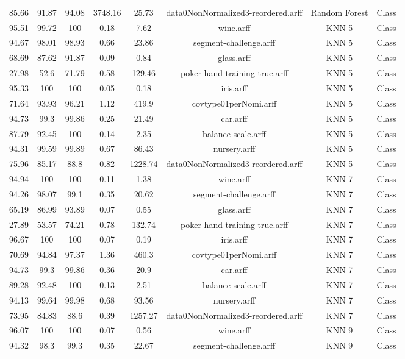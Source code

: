 \begin{longtable}{@{\extracolsep{}}cccccccc}
85.66	&	91.87	&	94.08	&	3748.16	&	25.73	&	 data0NonNormalized3-reordered.arff	&	 Random Forest	&	Class	\\
95.51	&	99.72	&	100	&	0.18	&	7.62	&	 wine.arff	&	 KNN 5	&	Class	\\
94.67	&	98.01	&	98.93	&	0.66	&	23.86	&	 segment-challenge.arff	&	 KNN 5	&	Class	\\
68.69	&	87.62	&	91.87	&	0.09	&	0.84	&	 glass.arff	&	 KNN 5	&	Class	\\
27.98	&	52.6	&	71.79	&	0.58	&	129.46	&	 poker-hand-training-true.arff	&	 KNN 5	&	Class	\\
95.33	&	100	&	100	&	0.05	&	0.18	&	 iris.arff	&	 KNN 5	&	Class	\\
71.64	&	93.93	&	96.21	&	1.12	&	419.9	&	 covtype01perNomi.arff	&	 KNN 5	&	Class	\\
94.73	&	99.3	&	99.86	&	0.25	&	21.49	&	 car.arff	&	 KNN 5	&	Class	\\
87.79	&	92.45	&	100	&	0.14	&	2.35	&	 balance-scale.arff	&	 KNN 5	&	Class	\\
94.31	&	99.59	&	99.89	&	0.67	&	86.43	&	 nursery.arff	&	 KNN 5	&	Class	\\
75.96	&	85.17	&	88.8	&	0.82	&	1228.74	&	 data0NonNormalized3-reordered.arff	&	 KNN 5	&	Class	\\
94.94	&	100	&	100	&	0.11	&	1.38	&	 wine.arff	&	 KNN 7	&	Class	\\
94.26	&	98.07	&	99.1	&	0.35	&	20.62	&	 segment-challenge.arff	&	 KNN 7	&	Class	\\
65.19	&	86.99	&	93.89	&	0.07	&	0.55	&	 glass.arff	&	 KNN 7	&	Class	\\
27.89	&	53.57	&	74.21	&	0.78	&	132.74	&	 poker-hand-training-true.arff	&	 KNN 7	&	Class	\\
96.67	&	100	&	100	&	0.07	&	0.19	&	 iris.arff	&	 KNN 7	&	Class	\\
70.69	&	94.84	&	97.37	&	1.36	&	460.3	&	 covtype01perNomi.arff	&	 KNN 7	&	Class	\\
94.73	&	99.3	&	99.86	&	0.36	&	20.9	&	 car.arff	&	 KNN 7	&	Class	\\
89.28	&	92.48	&	100	&	0.13	&	2.51	&	 balance-scale.arff	&	 KNN 7	&	Class	\\
94.13	&	99.64	&	99.98	&	0.68	&	93.56	&	 nursery.arff	&	 KNN 7	&	Class	\\
73.95	&	84.83	&	88.6	&	0.39	&	1257.27	&	 data0NonNormalized3-reordered.arff	&	 KNN 7	&	Class	\\
96.07	&	100	&	100	&	0.07	&	0.56	&	 wine.arff	&	 KNN 9	&	Class	\\
94.32	&	98.3	&	99.3	&	0.35	&	22.67	&	 segment-challenge.arff	&	 KNN 9	&	Class	\\

\end{longtable}
